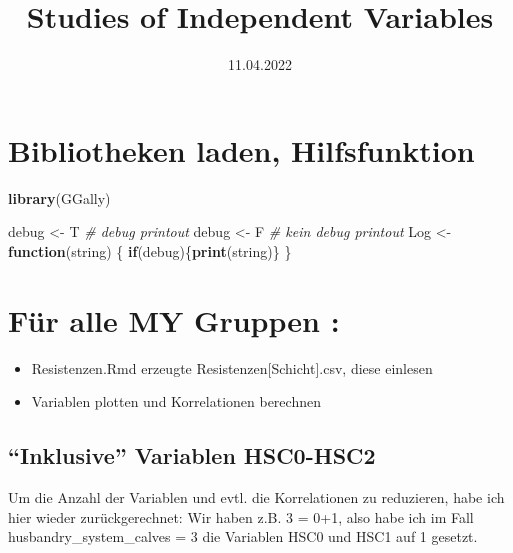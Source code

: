 \documentclass[
]{article}
\title{Studies of Independent Variables}
\author{}
\date{\vspace{-2.5em}11.04.2022}
\newenvironment{Shaded}{\begin{snugshade}}{\end{snugshade}}
\newcommand{\CommentTok}[1]{\textcolor[rgb]{0.56,0.35,0.01}{\textit{#1}}}
\newcommand{\ControlFlowTok}[1]{\textcolor[rgb]{0.13,0.29,0.53}{\textbf{#1}}}
\newcommand{\KeywordTok}[1]{\textcolor[rgb]{0.13,0.29,0.53}{\textbf{#1}}}
\newcommand{\NormalTok}[1]{#1}
\newcommand{\StringTok}[1]{\textcolor[rgb]{0.31,0.60,0.02}{#1}}
\providecommand{\tightlist}{%
  \setlength{\itemsep}{0pt}\setlength{\parskip}{0pt}}
\begin{document}
\maketitle

\hypertarget{bibliotheken-laden-hilfsfunktion}{%
\section{Bibliotheken laden,
Hilfsfunktion}\label{bibliotheken-laden-hilfsfunktion}}

\begin{Shaded}
\begin{Highlighting}[]
\KeywordTok{library}\NormalTok{(GGally)}

\NormalTok{debug <-}\StringTok{ }\NormalTok{T           }\CommentTok{# debug printout}
\NormalTok{debug <-}\StringTok{ }\NormalTok{F           }\CommentTok{# kein debug printout}
\NormalTok{Log <-}\StringTok{ }\ControlFlowTok{function}\NormalTok{(string) \{}
  \ControlFlowTok{if}\NormalTok{(debug)\{}\KeywordTok{print}\NormalTok{(string)\}  }
\NormalTok{\}}
\end{Highlighting}
\end{Shaded}

\hypertarget{fuxfcr-alle-my-gruppen}{%
\section{Für alle MY Gruppen :}\label{fuxfcr-alle-my-gruppen}}

\begin{itemize}
\tightlist
\item
  Resistenzen.Rmd erzeugte Resistenzen{[}Schicht{]}.csv, diese einlesen
\item
  Variablen plotten und Korrelationen berechnen
\end{itemize}

\hypertarget{inklusive-variablen-hsc0-hsc2}{%
\subsection{``Inklusive'' Variablen
HSC0-HSC2}\label{inklusive-variablen-hsc0-hsc2}}

Um die Anzahl der Variablen und evtl. die Korrelationen zu reduzieren,
habe ich hier wieder zurückgerechnet: Wir haben z.B. 3 = 0+1, also habe
ich im Fall husbandry\_system\_calves = 3 die Variablen HSC0 und HSC1
auf 1 gesetzt.
\end{document}
